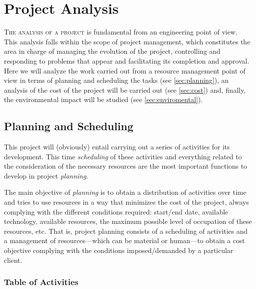 

\chapter{Project Analysis}\label{cha:analysis}



\lettrine{T}{he analysis of a project} is fundamental from an engineering point
of view. This analysis falls within the scope of project management, which
constitutes the area in charge of managing the evolution of the project,
controlling and responding to problems that appear and facilitating its
completion and approval. Here we will analyze the work carried out from a
resource management point of view in terms of planning and scheduling the tasks
(see \vref{sec:planning}), an analysis of the cost of the project will be
carried out (see \vref{sec:cost}) and, finally, the environmental impact will
be studied (see \vref{sec:enviromental}).



\section{Planning and Scheduling}%
\label{sec:planning}

This project will (obviously) entail carrying out a series of activities for
its development. This time \emph{scheduling} of these activities and everything
related to the consideration of the necessary resources are the most important
functions to develop in project \emph{planning}.

The main objective of \emph{planning} is to obtain a distribution of activities
over time and tries to use resources in a way that minimizes the cost of the
project, always complying with the different conditions required: start/end
date, available technology, available resources, the maximum possible level of
occupation of these resources, etc. That is, project planning consists of a
scheduling of activities and a management of resources---which can be material
or human---to obtain a cost objective complying with the conditions
imposed/demanded by a particular client.


\subsection{Table of Activities}\label{sec:activities}

